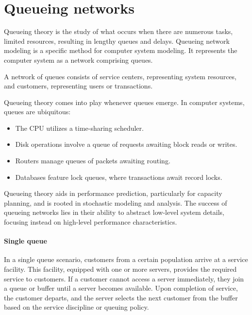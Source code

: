 \section{Queueing networks}

Queueing theory is the study of what occurs when there are numerous tasks, limited resources, resulting in lengthy queues and delays.
Queueing network modeling is a specific method for computer system modeling. 
It represents the computer system as a network comprising queues.
\begin{definition}
    A network of queues consists of service centers, representing system resources, and customers, representing users or transactions.
\end{definition}

Queueing theory comes into play whenever queues emerge. 
In computer systems, queues are ubiquitous:
\begin{itemize}
    \item The CPU utilizes a time-sharing scheduler.
    \item Disk operations involve a queue of requests awaiting block reads or writes.
    \item Routers manage queues of packets awaiting routing.
    \item Databases feature lock queues, where transactions await record locks.
\end{itemize}
Queueing theory aids in performance prediction, particularly for capacity planning, and is rooted in stochastic modeling and analysis.
The success of queueing networks lies in their ability to abstract low-level system details, focusing instead on high-level performance characteristics.

\paragraph*{Single queue}
In a single queue scenario, customers from a certain population arrive at a service facility.
This facility, equipped with one or more servers, provides the required service to customers.
If a customer cannot access a server immediately, they join a queue or buffer until a server becomes available.
Upon completion of service, the customer departs, and the server selects the next customer from the buffer based on the service discipline or queuing policy.

